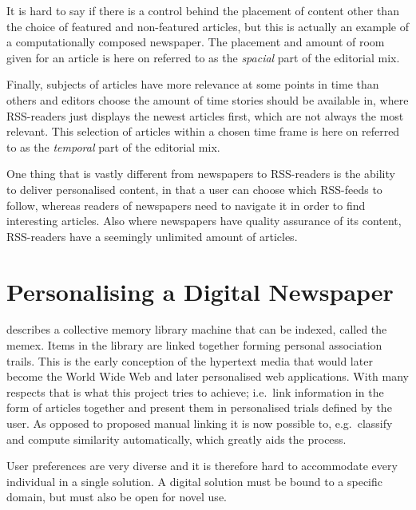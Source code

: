 
It is hard to say if there is a control behind the placement of content other than the choice of featured and non-featured articles, but this is actually an example of a computationally composed newspaper. The placement and amount of room given for an article is here on referred to as the \emph{spacial} part of the editorial mix.

Finally, subjects of articles have more relevance at some points in time than others and editors choose the amount of time stories should be available in, where RSS-readers just displays the newest articles first, which are not always the most relevant. This selection of articles within a chosen time frame is here on referred to as the \emph{temporal} part of the editorial mix.

One thing that is vastly different from newspapers to RSS-readers is the ability to deliver personalised content, in that a user can choose which RSS-feeds to follow, whereas readers of newspapers need to navigate it in order to find interesting articles. Also where newspapers have quality assurance of its content, RSS-readers have a seemingly unlimited amount of articles.

\section{Personalising a Digital Newspaper}
\cite{BushMemex} describes a collective memory library machine that can be indexed, called the memex. Items in the library are linked together forming personal association trails. This is the early conception of the hypertext media that would later become the World Wide Web and later personalised web applications. With many respects that is what this project tries to achieve; i.e.\ link information in the form of articles together and present them in personalised trials defined by the user. As opposed to \cite{BushMemex} proposed manual linking it is now possible to, e.g.\ classify and compute similarity automatically, which greatly aids the process. 

User preferences are very diverse and it is therefore hard to accommodate every individual in a single solution. A digital solution must be bound to a specific domain, but must also be open for novel use.

